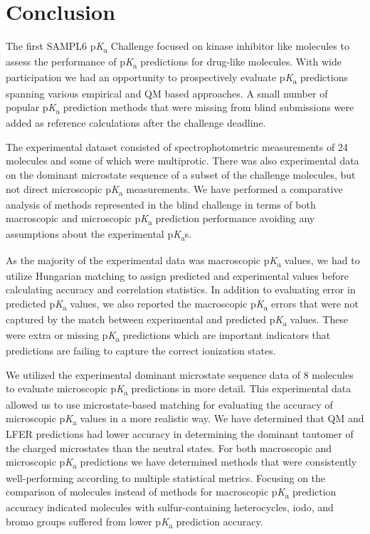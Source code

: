 \documentclass[9pt,lineno,final]{elife}
\newcommand{\pKa}{p\textit{K}\textsubscript{a}}
\begin{document}
\section{Conclusion}

The first SAMPL6 \pKa{} Challenge focused on kinase inhibitor like molecules to assess the performance of \pKa{} predictions for drug-like molecules. With wide participation we had an opportunity to prospectively evaluate \pKa{} predictions spanning various empirical and QM based approaches. A small number of popular \pKa{} prediction methods that were missing from blind submissions were added as reference calculations after the challenge deadline. 

The experimental dataset consisted of spectrophotometric measurements of 24 molecules and some of which were multiprotic. There was also experimental data on the dominant microstate sequence of a  subset of the challenge molecules, but not direct microscopic \pKa{} measurements. We have performed a comparative analysis of methods represented in the blind challenge in terms of both macroscopic and microscopic \pKa{} prediction performance avoiding any assumptions about the experimental \pKa{}s. 

As the majority of the experimental data was macroscopic \pKa{} values, we had to utilize Hungarian matching to assign predicted and experimental values before calculating accuracy and correlation statistics. In addition to evaluating error in predicted \pKa{} values, we also reported the macroscopic \pKa{} errors that were not captured by the match between experimental and predicted \pKa{} values. These were extra or missing \pKa{} predictions which are important indicators that predictions are failing to capture the correct ionization states. 

We utilized the experimental dominant microstate sequence data of 8 molecules to evaluate microscopic \pKa{} predictions in more detail. This experimental data allowed us to use microstate-based matching for evaluating the accuracy of microscopic \pKa{} values in a more realistic way. We have determined that QM and LFER predictions had lower accuracy in determining the dominant tautomer of the charged microstates than the neutral states. For both macroscopic and microscopic \pKa{} predictions we have determined methods that were consistently well-performing according to multiple statistical metrics. Focusing on the comparison of molecules instead of methods for macroscopic \pKa{} prediction accuracy indicated molecules with sulfur-containing heterocycles, iodo, and bromo groups suffered from lower \pKa{} prediction accuracy. 
\end{document}
